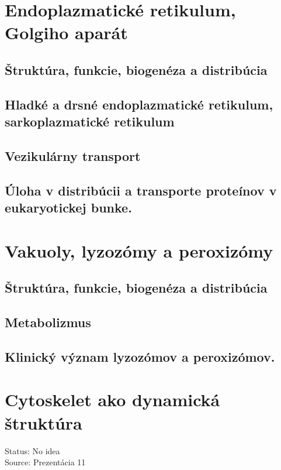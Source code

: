 \section{Endoplazmatické retikulum, Golgiho aparát}

\subsection*{Štruktúra, funkcie, biogenéza a distribúcia}

\subsection*{Hladké a drsné endoplazmatické retikulum, sarkoplazmatické retikulum}

\subsection*{Vezikulárny transport}

\subsection*{Úloha v distribúcii a transporte proteínov v eukaryotickej bunke.}

\section{Vakuoly, lyzozómy a peroxizómy}

\subsection*{Štruktúra, funkcie, biogenéza a distribúcia}

\subsection*{Metabolizmus}

\subsection*{Klinický význam lyzozómov a peroxizómov. }

\section{Cytoskelet ako dynamická štruktúra}

Status: No idea\\
Source: Prezentácia 11\\

